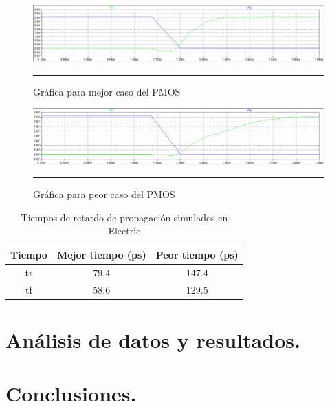 \documentclass[12pt,a4paper]{article} %
\begin{document}
\begin{figure}[htbp]
\begin{center}
    \includegraphics[scale=0.5]{./Mejor_caso_red_pmos.png}
    \rule{35em}{0.5pt}
  \caption[Captura]{Gráfica para mejor caso del PMOS}
  \label{fig:m_pmos}
  \end{center}
\end{figure}


\begin{figure}[htbp]
\begin{center}
    \includegraphics[scale=0.5]{./Peor_caso_red_pmos.png}
    \rule{35em}{0.5pt}
  \caption[Captura]{Gráfica para peor caso del PMOS}
  \label{fig:p_pmos}
  \end{center}
\end{figure}

\begin{table}\label{table:Tabla_propagacion}
\begin{center}
\begin{tabular}{c||c||c}
Tiempo  & Mejor tiempo (ps) & Peor tiempo (ps)\\
\hline
\hline
tr & 79.4 & 147.4 \\
tf & 58.6 & 129.5 \\
\hline
\end{tabular}
\caption{Tiempos de retardo de propagación simulados en Electric}
\end{center}
\end{table}


\section{Análisis de datos y resultados.}



\section{Conclusiones.}
\end{document}
